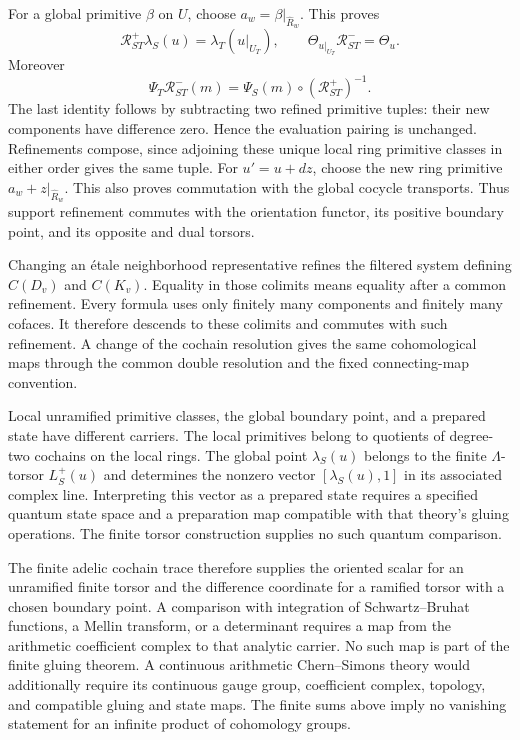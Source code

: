 For a global primitive \(\beta\) on \(U\), choose
\(a_w=\beta|_{\widehat R_w}\). This proves
\[
 \mathcal R_{ST}^+\lambda_S(u)=\lambda_T(u|_{U_T}),\qquad
 \Theta_{u|_{U_T}}\mathcal R_{ST}^-=\Theta_u.
\]
Moreover
\[
 \Psi_T\mathcal R_{ST}^-(m)
    =\Psi_S(m)\circ(\mathcal R_{ST}^+)^{-1}.
\]
The last identity follows by subtracting two refined primitive tuples:
their new components have difference zero. Hence the evaluation pairing
is unchanged. Refinements compose, since adjoining these unique local
ring primitive classes in either order gives the same tuple.
For \(u'=u+dz\), choose the new ring primitive \(a_w+z|_{\widehat R_w}\).
This also proves commutation with the global cocycle transports.
Thus support refinement commutes with the orientation functor, its
positive boundary point, and its opposite and dual torsors.

Changing an \'etale neighborhood representative refines the filtered
system defining \(C(D_v)\) and \(C(K_v)\). Equality in those
colimits means equality after a common refinement. Every formula
uses only finitely many components and finitely many cofaces.
It therefore descends to these colimits and commutes with such
refinement. A change of the cochain resolution gives the same
cohomological maps through the common double resolution and the
fixed connecting-map convention.

Local unramified primitive classes, the global boundary point, and a
prepared state have different carriers. The local primitives belong
to quotients of degree-two cochains on the local rings. The global
point \(\lambda_S(u)\) belongs to the finite
\(\Lambda\)-torsor \(L_S^+(u)\) and determines the nonzero vector
\([\lambda_S(u),1]\) in its associated complex line. Interpreting this
vector as a prepared state requires a specified quantum state space and
a preparation map compatible with that theory's gluing operations.
The finite torsor construction supplies no such quantum comparison.

The finite adelic cochain trace therefore supplies the oriented scalar
for an unramified finite torsor and the difference coordinate for a
ramified torsor with a chosen boundary point. A comparison
with integration of Schwartz--Bruhat functions, a Mellin transform,
or a determinant requires a map from the arithmetic coefficient
complex to that analytic carrier. No such map is part of the
finite gluing theorem. A continuous arithmetic Chern--Simons theory
would additionally require its continuous gauge group, coefficient
complex, topology, and compatible gluing and state maps. The finite
sums above imply no vanishing statement for an infinite product of
cohomology groups.
